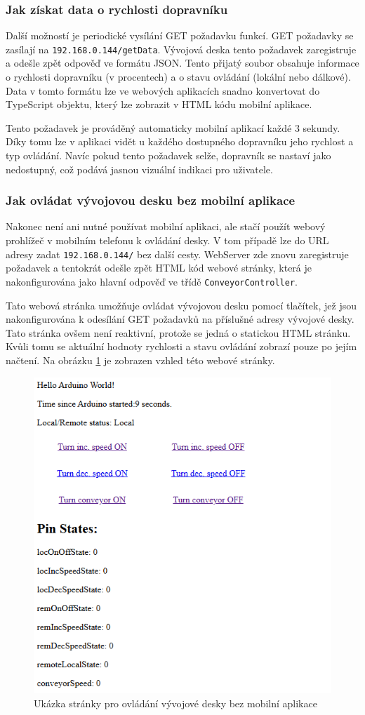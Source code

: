 \subsubsection{Jak získat data o rychlosti dopravníku}
Další možností je periodické vysílání GET požadavku funkcí. GET požadavky se zasílají na \texttt{192.168.0.144/getData}. Vývojová deska tento požadavek zaregistruje a odešle zpět odpověď ve formátu JSON. Tento přijatý soubor obsahuje informace o rychlosti dopravníku (v procentech) a o stavu ovládání (lokální nebo dálkové). Data v tomto formátu lze ve webových aplikacích snadno konvertovat do TypeScript objektu, který lze zobrazit v HTML kódu mobilní aplikace.

Tento požadavek je prováděný automaticky mobilní aplikací každé 3 sekundy. Díky tomu lze v aplikaci vidět u každého dostupného dopravníku jeho rychlost a typ ovládání. Navíc pokud tento požadavek selže, dopravník se nastaví jako nedostupný, což podává jasnou vizuální indikaci pro uživatele.

\subsubsection{Jak ovládat vývojovou desku bez mobilní aplikace}\label{sec:JakOvladatBezMobilniAplikace}
Nakonec není ani nutné používat mobilní aplikaci, ale stačí použít webový prohlížeč v mobilním telefonu k ovládání desky. V tom případě lze do URL adresy zadat \texttt{192.168.0.144/} bez další cesty. WebServer zde znovu zaregistruje požadavek a tentokrát odešle zpět HTML kód webové stránky, která je nakonfigurována jako hlavní odpověď ve třídě \texttt{Con\-ve\-yor\-Con\-tro\-ller}.

Tato webová stránka umožňuje ovládat vývojovou desku pomocí tlačítek, jež jsou nakonfigurována k odesílání GET požadavků na příslušné adresy vývojové desky. Tato stránka ovšem není reaktivní, protože se jedná o statickou HTML stránku. Kvůli tomu se aktuální hodnoty rychlosti a stavu ovládání zobrazí pouze po jejím načtení. Na obrázku \ref{fig:WebServerLandingPage} je zobrazen vzhled této webové stránky.

\begin{figure}[hptb]
	\centering
	\includegraphics[width=0.6\linewidth]{images/WebServerLandingPage.png}
	\caption{Ukázka stránky pro ovládání vývojové desky bez mobilní aplikace}
	\label{fig:WebServerLandingPage}
\end{figure}

